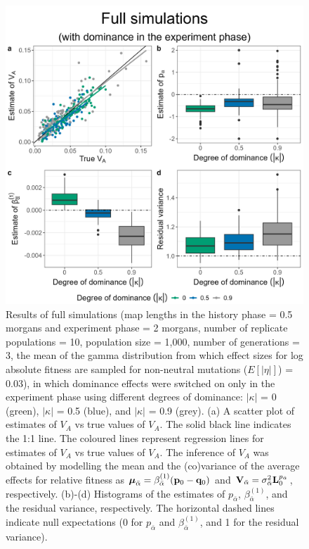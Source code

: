 \documentclass[12pt]{article}
\begin{document}
\begin{bibunit}
\begin{figure}[H]
\centering
\includegraphics[scale = 0.15]{Figures/full_dominance_sprinkled.jpg}
\caption{Results of full simulations  (map lengths in the history phase = 0.5 morgans and experiment phase = 2 morgans, number of replicate populations = 10, population size = 1,000, number of generations = 3, the mean of the gamma distribution from which effect sizes for log absolute fitness are sampled for non-neutral mutations ($E[|\eta|]$) = 0.03), in which dominance effects were switched on only in the experiment phase using different degrees of dominance: $|\kappa|$ = 0 (green), $|\kappa|$ = 0.5 (blue), and $|\kappa|$ = 0.9 (grey). (a) A scatter plot of estimates of $V_A$ vs true values of $V_A$. The solid black line indicates the 1:1 line. The coloured lines represent regression lines for estimates of $V_A$ vs true values of $V_A$. The inference of $V_A$ was obtained by modelling the mean and the (co)variance of the average effects for relative fitness as $\boldsymbol{\mu}_{\bar{\alpha}} = \beta^{(1)}_{\bar{\alpha}}({\bf p}_{0}-{\bf q}_{0})$ and ${\bf V}_{\bar{\alpha}}=\sigma^2_{\bar{\alpha}}{\bf L}_{0}^{p_{\bar{\alpha}}}$, respectively.   (b)-(d) Histograms of the estimates of $p_{\bar \alpha} $, $\beta^{(1)}_{\bar{\alpha}}$, and the residual variance, respectively. The horizontal dashed lines indicate null expectations (0 for $p_{\bar \alpha} $ and $\beta^{(1)}_{\bar{\alpha}}$, and 1 for the residual variance).}
  \label{fig:full_dominance_sprinkled}
\end{figure}


\end{bibunit}
\end{document}
